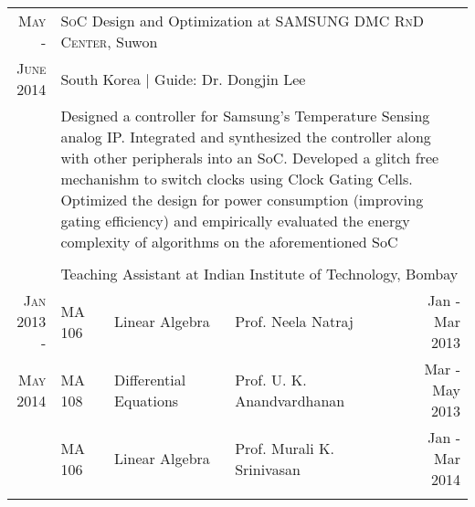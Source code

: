 
\begin{tabularx}{0.95\textwidth}{r|lXXr}
	\textsc{May -} 		& \multicolumn{4}{l}{\textsc{SoC} Design and Optimization at \textsc{SAMSUNG DMC RnD Center}, Suwon}\\
	\textsc{June 2014} 	& \multicolumn{4}{l}{South Korea | \small Guide: Dr. Dongjin Lee}\\ 
				& \multicolumn{4}{p{13.6cm}}{\small{Designed a controller for Samsung's Temperature Sensing analog IP. Integrated and synthesized the controller along with other peripherals into an SoC. Developed a glitch free mechanishm to switch clocks using Clock Gating Cells. Optimized the design for power consumption (improving gating efficiency) and empirically evaluated the energy complexity of algorithms on the aforementioned SoC}}\\
	\multicolumn{5}{c}{} \\
	& \multicolumn{4}{p{13.6cm}}{Teaching Assistant at Indian Institute of Technology, Bombay}\\
	\textsc{Jan  2013 -} 	& \footnotesize{MA 106} & \footnotesize{Linear Algebra} 	& \footnotesize{Prof. Neela Natraj} 		& \footnotesize{Jan - Mar 2013}\\
	\textsc{May 2014} 	& \footnotesize{MA 108} & \footnotesize{Differential Equations} & \footnotesize{Prof. U. K. Anandvardhanan} 	& \footnotesize{Mar - May 2013}\\
				&\footnotesize{MA 106} 	& \footnotesize{Linear Algebra} 	& \footnotesize{Prof. Murali K. Srinivasan} 	& \footnotesize{Jan - Mar 2014}\\
	\multicolumn{5}{c}{} \\
\end{tabularx}


